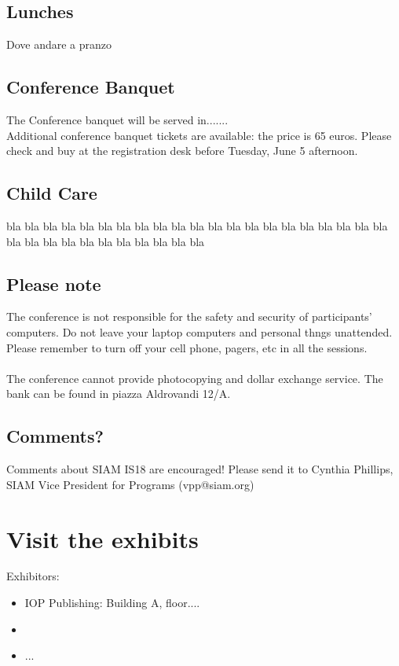 \begin{multicols}{2}
\subsection*{Lunches}
Dove andare a pranzo

\subsection*{Conference Banquet}
The Conference banquet will be served in.......\\ Additional conference banquet tickets are available: the price is 65 euros. Please check and buy at the registration desk before Tuesday, June 5 afternoon.

\subsection*{Child Care}
bla bla bla bla bla bla bla bla bla bla bla bla bla bla bla bla bla bla bla bla bla bla bla bla bla bla bla bla bla bla bla bla

\subsection*{Please note}
The conference is not responsible for the safety and security of participants' computers. Do not leave your laptop computers and personal thngs unattended. Please remember to turn off your cell phone, pagers, etc in all the sessions.\\\\ The conference cannot provide photocopying and dollar exchange service. The bank can be found in piazza Aldrovandi 12/A.

\subsection*{Comments?}
Comments about SIAM IS18 are encouraged! Please send it to Cynthia Phillips, SIAM Vice President for Programs (vpp@siam.org)
\end{multicols}

\section*{Visit the exhibits}
Exhibitors:
\begin{itemize}
\item IOP Publishing: Building A, floor....
\item
\item ...
\end{itemize}


